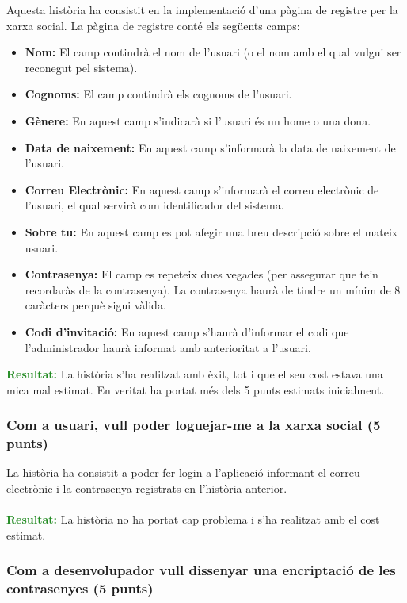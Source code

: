 \documentclass[11pt,catalan,listoffigures,listoftables]{tfgetsinf}
\begin{document}
Aquesta història ha consistit en la implementació d'una pàgina de registre per la xarxa social. La pàgina de registre conté els següents camps:
\begin{itemize}
\item \textbf{Nom:} El camp contindrà el nom de l'usuari (o el nom amb el qual vulgui ser reconegut pel sistema).
\item \textbf{Cognoms:} El camp contindrà els cognoms de l'usuari.
\item \textbf{Gènere:} En aquest camp s'indicarà si l'usuari és un home o una dona.
\item \textbf{Data de naixement:} En aquest camp s'informarà la data de naixement de l'usuari.
\item \textbf{Correu Electrònic:} En aquest camp s'informarà el correu electrònic de l'usuari, el qual servirà com identificador del sistema.
\item \textbf{Sobre tu:} En aquest camp es pot afegir una breu descripció sobre el mateix usuari.
\item \textbf{Contrasenya:} El camp es repeteix dues vegades (per assegurar que te'n recordaràs de la contrasenya). La contrasenya haurà de tindre un mínim de 8 caràcters perquè sigui vàlida.
\item \textbf{Codi d'invitació:} En aquest camp s'haurà d'informar el codi que l'administrador haurà informat amb anterioritat a l'usuari.
\end{itemize}
\textcolor{forestgreen}{\textbf{Resultat:}} La història s'ha realitzat amb èxit, tot i que el seu cost estava una mica mal estimat. En veritat ha portat més dels 5 punts estimats inicialment.

\subsubsection{Com a usuari, vull poder loguejar-me a la xarxa social (5 punts)}

La història ha consistit a poder fer login a l'aplicació informant el correu electrònic i la contrasenya registrats en l'història anterior.\\ \\
\textcolor{forestgreen}{\textbf{Resultat:}} La història no ha portat cap problema i s'ha realitzat amb el cost estimat.

\subsubsection{Com a desenvolupador vull dissenyar una encriptació de les contrasenyes (5 punts)}
\end{document}
